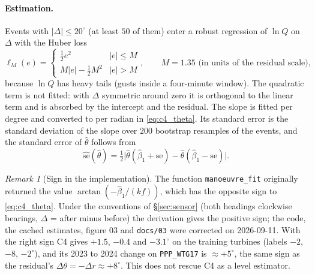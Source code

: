 \documentclass[11pt,a4paper]{article}
\theoremstyle{remark}
\newtheorem{remark}{Remark}
\newcommand{\dg}{^{\circ}}
\newcommand{\code}[1]{\texttt{#1}}
\begin{document}
\paragraph{Estimation.} Events with $|\Delta|\le20\dg$ (at least $50$ of them)
enter a robust regression of $\ln Q$ on $\Delta$ with the Huber loss
\begin{equation}
  \ell_M(e) = \begin{cases} \tfrac12 e^2 & |e|\le M \\ M|e| - \tfrac12 M^2 & |e|>M\end{cases},
  \qquad M = 1.35 \text{ (in units of the residual scale)},
  \label{eq:huber}
\end{equation}
because $\ln Q$ has heavy tails (gusts inside a four-minute window). The
quadratic term is not fitted: with $\Delta$ symmetric around zero it is
orthogonal to the linear term and is absorbed by the intercept and the residual.
The slope is fitted per degree and converted to per radian in
\eqref{eq:c4_theta}. Its standard error is the standard deviation of the slope
over $200$ bootstrap resamples of the events, and the standard error of
$\hat\theta$ follows from
\begin{equation}
  \widehat{\mathrm{se}}(\hat\theta) = \tfrac12\big|\hat\theta(\hat\beta_1+\mathrm{se}) - \hat\theta(\hat\beta_1-\mathrm{se})\big| .
\end{equation}

\begin{remark}[Sign in the implementation]
The function \code{manoeuvre\_fit} originally returned the
value $\arctan(-\hat\beta_1/(kf))$, which has the opposite sign to
\eqref{eq:c4_theta}. Under
the conventions of \S\ref{sec:sensor} (both headings clockwise bearings,
$\Delta$ = after minus before) the derivation gives the positive sign; the code,
the cached estimates, figure 03 and \code{docs/03} were corrected on
2026-09-11. With the right sign C4 gives $+1.5$, $-0.4$ and $-3.1\dg$ on the
training turbines (labels $-2$, $-8$, $-2\dg$), and its 2023 to 2024 change
on \code{PPP\_WTG17} is $\approx+5\dg$, the same sign as the residual's
$\Delta\theta=-\Delta r\approx+8\dg$. This does not rescue C4 as a level
estimator.
\end{remark}
\end{document}
